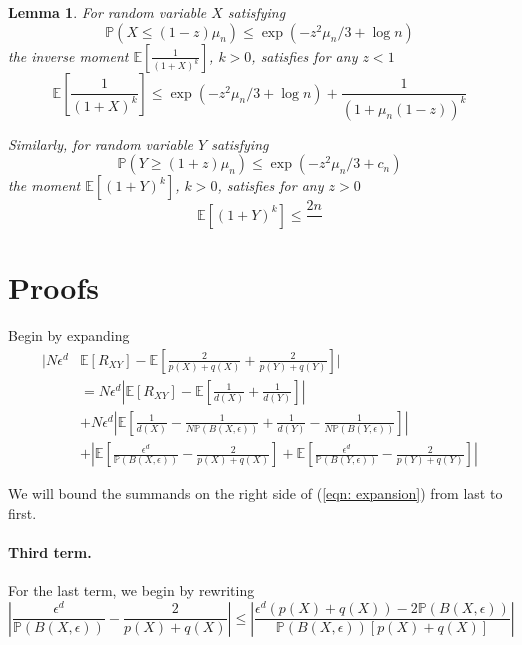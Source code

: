 \documentclass{article}
\newcommand{\Expect}[1]{\mathbb{E}\left[ #1 \right]}
\newcommand{\Prob}[1]{\mathbb{P}\left( #1 \right)}
\newcommand{\abs}[1]{\left \lvert #1 \right \rvert}
\theoremstyle{alden}
\newtheorem{lemma}{Lemma}
\theoremstyle{definition}
\theoremstyle{remark}
\begin{document}
\begin{lemma}
	\label{lem: prob_to_expectation}
	For random variable $X$ satisfying
	\begin{equation*}
	\Prob{X \leq (1 - z)\mu_n} \leq \exp(-z^2 \mu_n/3 + \log n)
	\end{equation*}
	the inverse moment $\Expect{\frac{1}{(1 + X)^k}}$, $k > 0$, satisfies for any $z < 1$ 
	\begin{equation*}
	\Expect{\frac{1}{(1 + X)^k}} \leq \exp(-z^2 \mu_n/3 + \log n) + \frac{1}{(1 + \mu_n(1 - z))^k}
	\end{equation*}
	
	Similarly, for random variable $Y$ satisfying
	\begin{equation*}
	\Prob{Y \geq (1 + z)\mu_n} \leq \exp(-z^2 \mu_n/3 + c_n)
	\end{equation*}
	the moment $\Expect{(1 + Y)^k}$, $k > 0$, satisfies for any $z > 0$ 
	\begin{equation*}
	\Expect{(1 + Y)^k} \leq \frac{2 n}{} 
	\end{equation*}
\end{lemma}


\section{Proofs}

Begin by expanding
\begin{align}
\label{eqn: expansion}
 \bigg| N \epsilon^d & \Expect{R_{XY}} - \Expect{\frac{2}{p(X) + q(X)} + \frac{2}{p(Y) + q(Y)}} \bigg| \nonumber \\
& = N \epsilon^d \abs{\Expect{R_{XY}} - \Expect{\frac{1}{d(X)} + \frac{1}{d(Y)}}} \nonumber \\
& +  N \epsilon^d \abs{\Expect{\frac{1}{d(X)} - \frac{1}{N \Prob{B(X,\epsilon)} } + \frac{1}{d(Y)} - \frac{1}{N \Prob{B(Y,\epsilon)}}}} \nonumber \\
& + \abs{ \Expect{\frac{\epsilon^d }{\Prob{B(X,\epsilon)} }  - \frac{2}{p(X) + q(X)} } + \Expect{ \frac{\epsilon^d }{\Prob{B(Y,\epsilon)} }  - \frac{2}{p(Y) + q(Y)} } } 
\end{align}

We will bound the summands on the right side of (\ref{eqn: expansion}) from last to first. 

\paragraph{Third term.}

For the last term, we begin by rewriting
\begin{equation*}
\abs{ \frac{\epsilon^d }{\Prob{B(X,\epsilon)} }  - \frac{2}{p(X) + q(X)} } \leq \abs{ \frac{\epsilon^d(p(X) + q(X)) - 2 \Prob{B(X,\epsilon)}}{\Prob{B(X,\epsilon)}[p(X) + q(X)]} }
\end{equation*}
\end{document}
